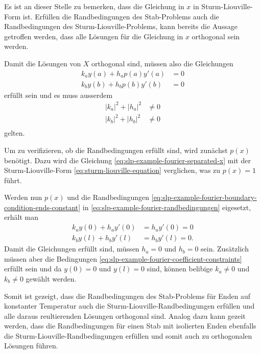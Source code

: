 Es ist an dieser Stelle zu bemerken, dass die Gleichung in $x$ in 
Sturm-Liouville-Form ist.
Erfüllen die Randbedingungen des Stab-Problems auch die Randbedingungen des
Sturm-Liouville-Problems, kann bereits die Aussage getroffen werden, dass alle
Lösungen für die Gleichung in $x$ orthogonal sein werden.

Damit die Lösungen von $X$ orthogonal sind, müssen also die Gleichungen
\begin{equation}
\begin{aligned}
	\label{eq:slp-example-fourier-randbedingungen}
	k_a y(a) + h_a p(a) y'(a) &= 0 \\
	k_b y(b) + h_b p(b) y'(b) &= 0
\end{aligned}
\end{equation}
erfüllt sein und es muss ausserdem
\begin{equation}
\begin{aligned}
    \label{eq:slp-example-fourier-coefficient-constraints}
    |k_a|^2 + |h_a|^2 &\neq 0\\
    |k_b|^2 + |h_b|^2 &\neq 0\\
\end{aligned}
\end{equation}
gelten.

Um zu verifizieren, ob die Randbedingungen erfüllt sind, wird zunächst
$p(x)$
benötigt.
Dazu wird die Gleichung \eqref{eq:slp-example-fourier-separated-x} mit der
Sturm-Liouville-Form \eqref{eq:sturm-liouville-equation} verglichen, was zu
$p(x) = 1$ führt.

Werden nun $p(x)$ und die Randbedingungen
\eqref{eq:slp-example-fourier-boundary-condition-ends-constant} in
\eqref{eq:slp-example-fourier-randbedingungen} eigesetzt, erhält man
\[
\begin{aligned}
	k_a y(0) + h_a y'(0) &= h_a y'(0) = 0 \\
	k_b y(l) + h_b y'(l) &= h_b y'(l) = 0.
\end{aligned}
\]
Damit die Gleichungen erfüllt sind, müssen $h_a = 0$ und $h_b = 0$ sein.
Zusätzlich müssen aber die Bedingungen 
\eqref{eq:slp-example-fourier-coefficient-constraints} erfüllt sein und
da $y(0) = 0$ und $y(l) = 0$ sind, können belibige $k_a \neq 0$ und $k_b \neq 0$
gewählt werden.

Somit ist gezeigt, dass die Randbedingungen des Stab-Problems für Enden auf
konstanter Temperatur auch die Sturm-Liouville-Randbedingungen erfüllen und
alle daraus reultierenden Lösungen orthogonal sind.
Analog dazu kann gezeit werden, dass die Randbedingungen für einen Stab mit
isolierten Enden ebenfalls die Sturm-Liouville-Randbedingungen erfüllen und
somit auch zu orthogonalen Lösungen führen.


